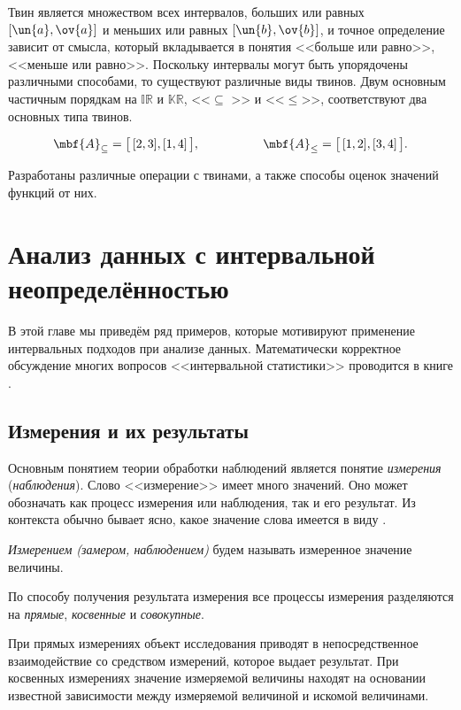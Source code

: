 \documentclass[a5paper,openany]{book}
\begin{document}
Твин является множеством всех интервалов, больших или равных $[\un{a}, \ov{a}]$ и меньших
или равных $[\un{b}, \ov{b}]$, и точное определение зависит от смысла, который вкладывается в понятия <<больше или равно>>, <<меньше или равно>>.
Поскольку интервалы могут быть упорядочены различными способами, то существуют 
различные виды твинов. Двум основным частичным порядкам на $\mathbb{IR}$ и $\mathbb{KR}$, 
<<$\subseteq$ >> и <<$\leq$>>,  соответствуют два основных типа твинов. 

\begin{equation}\label{TwinPresentations}
\mbf{A}_{\subseteq} = \bigl[\,[2,3], [1,4 ]\,\bigr], 
\hspace{18mm} 
\mbf{A}_{\leq} = \bigl[\,[1,2], [3,4 ]\,\bigr].
\end{equation}

Разработаны 
различные операции с твинами, а также способы оценок значений функций от них. 


\section{Анализ данных с интервальной неопределённостью} \label{InteDataAnalysis}

В этой главе мы приведём ряд примеров, которые мотивируют применение интервальных подходов при анализе данных. Математически корректное обсуждение многих вопросов <<интервальной статистики>> проводится в книге \cite{BookIntStat}. 

\subsection{Измерения и их результаты} 
\label{MeasuResultSect} 

	Основным понятием теории обработки наблюдений является понятие \emph{измерения} (\emph{наблюдения}). Слово <<измерение>> имеет много значений. Оно может 
обозначать как процесс измерения или наблюдения, так и его результат. Из контекста обычно 
бывает ясно, какое значение слова имеется в виду \cite{BookIntStat}.  
\begin{definition}       
	\textsl{Измерением (замером, наблюдением)} будем называть измеренное значение величины. 
\end{definition}
По способу получения результата измерения все процессы измерения разделяются 
на \emph{прямые}, \emph{косвенные} и \emph{совокупные}. 

При прямых измерениях объект исследования приводят в непосредственное взаимодействие 
со средством измерений, которое выдает результат.   
При косвенных измерениях значение измеряемой величины находят на основании  
известной зависимости между измеряемой величиной и искомой величинами. 
\end{document}
